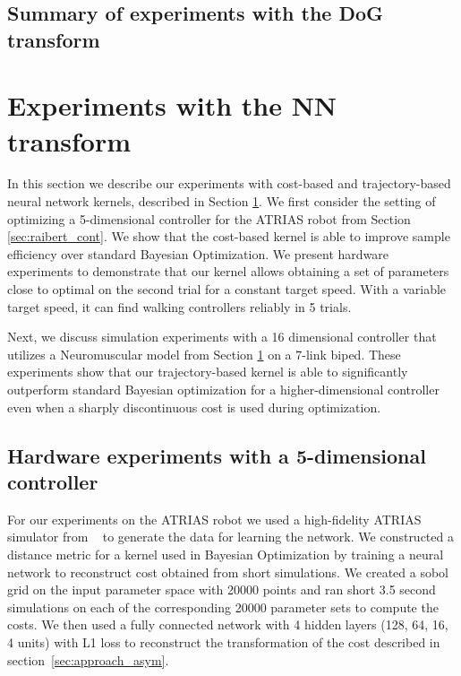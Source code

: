 
\subsection{Summary of experiments with the DoG transform}


\section{Experiments with the NN transform}

In this section we describe our experiments with cost-based and trajectory-based neural network kernels, described in Section \ref{}. We first consider the setting of optimizing a 5-dimensional controller for the ATRIAS robot from Section \ref{sec:raibert_cont}. We show that the cost-based kernel is able to improve sample efficiency over standard Bayesian Optimization. We present hardware experiments to demonstrate that our kernel allows obtaining a set of parameters close to optimal on the second trial for a constant target speed. With a variable target speed, it can find walking controllers reliably in 5 trials.

Next, we discuss simulation experiments with a 16 dimensional controller that utilizes a Neuromuscular model from Section \ref{} on a 7-link biped. These experiments show that our trajectory-based kernel is able to significantly outperform standard Bayesian optimization for a higher-dimensional controller even when a sharply discontinuous cost is used during optimization.

\subsection{Hardware experiments with a 5-dimensional controller}
\label{experiments_atrias}

For our experiments on the ATRIAS robot we used a high-fidelity ATRIAS simulator from ~\cite{martin2015robust} to generate the data for learning the network. 
We constructed a distance metric for a kernel used in Bayesian Optimization by training a neural network to reconstruct cost obtained from short simulations. We created a sobol grid on the input parameter space with 20000 points and ran short 3.5 second simulations on each of the corresponding 20000 parameter sets to compute the costs. We then used a fully connected network with 4 hidden layers (128, 64, 16, 4 units) with L1 loss to reconstruct the transformation of the cost described in section~\ref{sec:approach_asym}.

